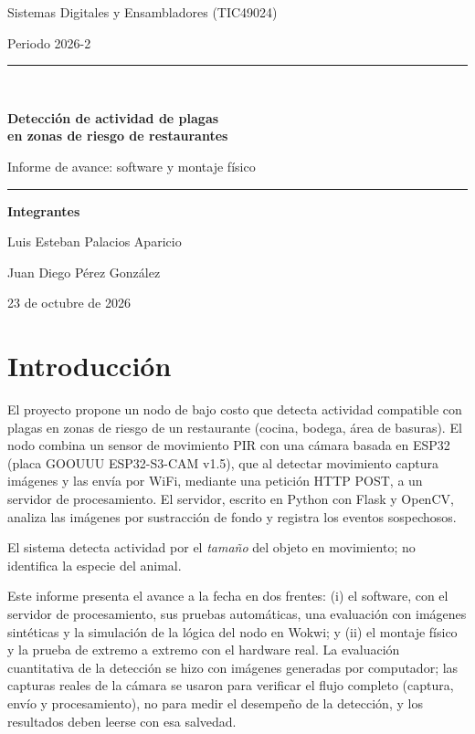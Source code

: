 \documentclass[11pt,a4paper]{article}
\begin{document}
\begin{titlepage}
\centering
\vspace*{2.5cm}
{\large Sistemas Digitales y Ensambladores (TIC49024)\par}
\vspace{0.4cm}
{\large Periodo 2026-2\par}
\vspace{2.2cm}
\rule{\textwidth}{0.8pt}\\[0.6cm]
{\LARGE\bfseries Detección de actividad de plagas\\en zonas de riesgo de restaurantes\par}
\vspace{0.4cm}
{\Large Informe de avance: software y montaje físico\par}
\rule{\textwidth}{0.8pt}
\vspace{2.5cm}

{\large\textbf{Integrantes}\par}
\vspace{0.3cm}
{\large Luis Esteban Palacios Aparicio\par}
{\large Juan Diego Pérez González\par}
\vfill
{\large 23 de octubre de 2026\par}
\end{titlepage}

\tableofcontents
\newpage

\section{Introducción}

El proyecto propone un nodo de bajo costo que detecta actividad compatible con plagas en zonas de riesgo de un restaurante (cocina, bodega, área de basuras). El nodo combina un sensor de movimiento PIR con una cámara basada en ESP32 (placa GOOUUU ESP32-S3-CAM v1.5), que al detectar movimiento captura imágenes y las envía por WiFi, mediante una petición HTTP POST, a un servidor de procesamiento. El servidor, escrito en Python con Flask y OpenCV, analiza las imágenes por sustracción de fondo y registra los eventos sospechosos.

El sistema detecta actividad por el \emph{tamaño} del objeto en movimiento; no identifica la especie del animal.

Este informe presenta el avance a la fecha en dos frentes: (i) el software, con el servidor de procesamiento, sus pruebas automáticas, una evaluación con imágenes sintéticas y la simulación de la lógica del nodo en Wokwi; y (ii) el montaje físico y la prueba de extremo a extremo con el hardware real. La evaluación cuantitativa de la detección se hizo con imágenes generadas por computador; las capturas reales de la cámara se usaron para verificar el flujo completo (captura, envío y procesamiento), no para medir el desempeño de la detección, y los resultados deben leerse con esa salvedad.
\end{document}
